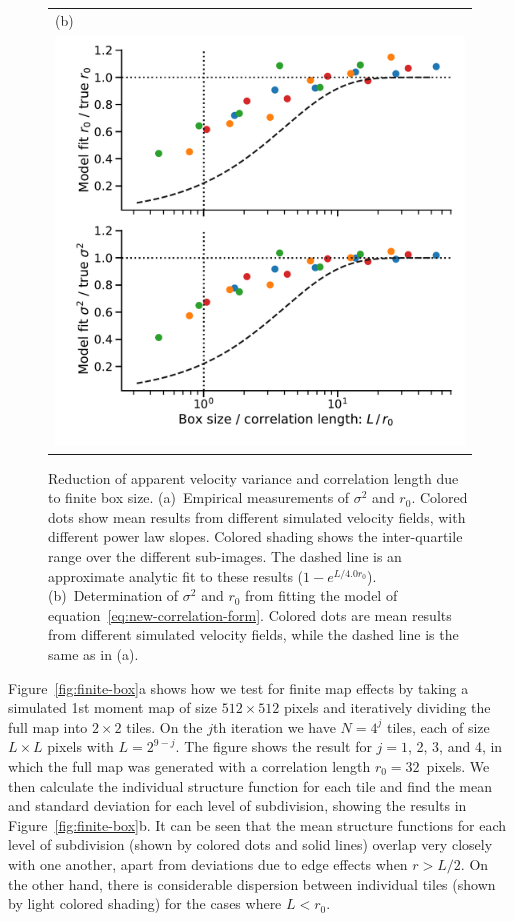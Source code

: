 \documentclass[fleqn,usenatbib, useAMS, a4paper]{mnras}
\newcommand\startNEW{\color{black}}
\newcommand\stopNEW{\color{black}}
\newcommand\NEW[1]{\startNEW #1\stopNEW\relax}
\begin{document}
\begin{figure}
\begin{tabular}{@{} l @{}}
    (b)\\ \includegraphics[width=0.95\linewidth]{Figures/fake-finite-box-fits-ems-fluct_sigE_1}
  \end{tabular}
  \caption{
    Reduction of apparent velocity variance and correlation length
    due to finite box size.
    (a)~Empirical measurements of \(\sigma^2\) and \(r_0\).
    Colored dots show mean results from different simulated velocity fields,
    with different power law slopes.
    Colored shading shows the inter-quartile range over the different sub-images.
    The dashed line is an approximate analytic fit to these results
    (\NEW{\(1 - e^{L / 4.0r_0}\)}).
    (b)~Determination of \(\sigma^2\) and \(r_0\) from fitting the model
    of equation~\eqref{eq:new-correlation-form}.
    Colored dots are mean results from different simulated velocity fields,
    while the dashed line is the same as in (a).
  }
  \label{fig:finite-box-effect}
\end{figure}

\NEW{Figure~\ref{fig:finite-box}a} shows how we test for finite map effects by taking
a simulated \NEW{1st moment map of} size \(512 \times 512\) pixels and iteratively
dividing the full map into \(2 \times 2\) tiles.
On the \(j\)th iteration we have \(N = 4^j\) tiles,
each of size \(L \times L \) pixels with \(L = 2^{9 - j}\).
The figure shows the result for \(j = 1\), 2, 3, and 4, in which the full map
was generated with a correlation length \NEW{\(r_0 = 32\)~pixels}.
We then calculate the individual structure function for each tile and
find the mean and standard deviation for each level of subdivision,
showing the results in \NEW{Figure~\ref{fig:finite-box}b}.
It can be seen that the mean structure functions for each level
of subdivision (shown by colored dots and solid lines)
overlap very closely with one another, apart from deviations
due to edge effects when \(r > L/2\).
On the other hand, there is considerable dispersion between
individual tiles (shown by light colored shading) for the cases
where \(L < r_0\).
\end{document}
